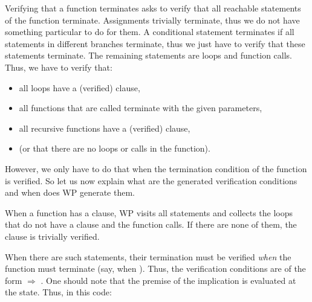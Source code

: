 


Verifying that a function terminates asks to verify that all reachable
statements of the function terminate. Assignments trivially terminate, thus
we do not have something particular to do for them. A conditional statement
terminates if all statements in different branches terminate, thus we just
have to verify that these statements terminate. The remaining statements are
loops and function calls. Thus, we have to verify that:



\begin{itemize}
  \item all loops have a (verified)  clause,
  \item all functions that are called terminate with the given parameters,
  \item all recursive functions have a (verified)  clause,
  \item (or that there are no loops or calls in the function).
\end{itemize}



However, we only have to do that when the termination condition of the function
is verified. So let us now explain what are the generated verification
conditions and when does WP generate them.



When a function has a  clause, WP visits all statements
and collects the loops that do not have a  clause and
the function calls. If there are none of them, the 
clause is trivially verified.






When there are such statements, their termination must be verified {\em when}
the function must terminate (say, when ). Thus, the verification
conditions are of the form
 $\Rightarrow$ .
One should note that the premise of the implication is evaluated at the
 state. Thus, in this code:






